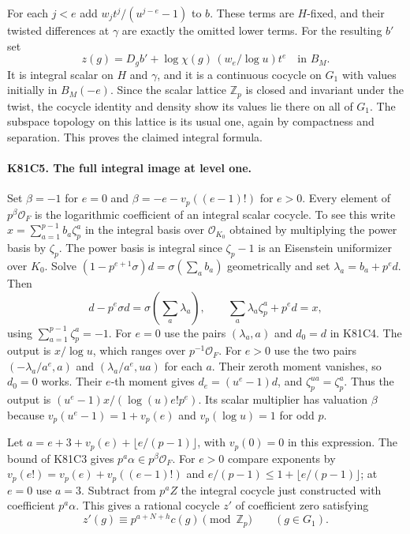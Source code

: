 For each $j<e$ add $w_jt^j/(u^{j-e}-1)$ to $b$. These terms
are $H$-fixed, and their twisted differences at $\gamma$ are
exactly the omitted lower terms. For the resulting $b'$ set
\[
 z(g)=D_g b'+\log\chi(g)\,(w_e/\log u)t^e\quad\text{in }B_M .
\]
It is integral scalar on $H$ and $\gamma$, and it is a continuous
cocycle on $G_1$ with values initially in $B_M(-e)$. Since the
scalar lattice $\mathbb Z_p$ is closed and invariant under the
twist, the cocycle identity and density show its values lie there
on all of $G_1$. The subspace topology on this lattice is its
usual one, again by compactness and separation. This proves the
claimed integral formula.

\paragraph{K81C5. The full integral image at level one.}
Set $\beta=-1$ for $e=0$ and $\beta=-e-v_p((e-1)!)$ for $e>0$.
Every element of $p^\beta\mathcal O_F$ is the logarithmic
coefficient of an integral scalar cocycle. To see this write
$x=\sum_{a=1}^{p-1}b_a\zeta_p^a$ in the integral basis over
$\mathcal O_{K_0}$ obtained by multiplying the power basis by
$\zeta_p$. The power basis is integral since $\zeta_p-1$ is
an Eisenstein uniformizer over $K_0$. Solve
$(1-p^{e+1}\sigma)d=\sigma(\sum_a b_a)$ geometrically and set
$\lambda_a=b_a+p^e d$. Then
\[
     d-p^e\sigma d=\sigma\!\left(\sum_a\lambda_a\right),
     \qquad \sum_a\lambda_a\zeta_p^a+p^ed=x,
\]
using $\sum_{a=1}^{p-1}\zeta_p^a=-1$. For $e=0$ use the pairs
$(\lambda_a,a)$ and $d_0=d$ in K81C4. The output is $x/\log u$,
which ranges over $p^{-1}\mathcal O_F$. For $e>0$ use the two
pairs $(-\lambda_a/a^e,a)$ and $(\lambda_a/a^e,ua)$ for each
$a$. Their zeroth moment vanishes, so $d_0=0$ works. Their
$e$-th moment gives $d_e=(u^e-1)d$, and $\zeta_p^{ua}=\zeta_p^a$.
Thus the output is $(u^e-1)x/(\log(u)e!p^e)$. Its scalar
multiplier has valuation $\beta$ because
$v_p(u^e-1)=1+v_p(e)$ and $v_p(\log u)=1$ for odd $p$.

Let $a=e+3+v_p(e)+\lfloor e/(p-1)\rfloor$, with $v_p(0)=0$
in this expression. The bound of K81C3 gives
$p^a\alpha\in p^\beta\mathcal O_F$. For $e>0$ compare exponents
by $v_p(e!)=v_p(e)+v_p((e-1)!)$ and
$e/(p-1)\le 1+\lfloor e/(p-1)\rfloor$; at $e=0$ use $a=3$.
Subtract from $p^aZ$ the integral cocycle just constructed with
coefficient $p^a\alpha$. This gives a rational cocycle $z'$ of
coefficient zero satisfying
\[
 z'(g)\equiv p^{a+N+h}c(g)\pmod{\mathbb Z_p}
                    \qquad (g\in G_1).
\]


